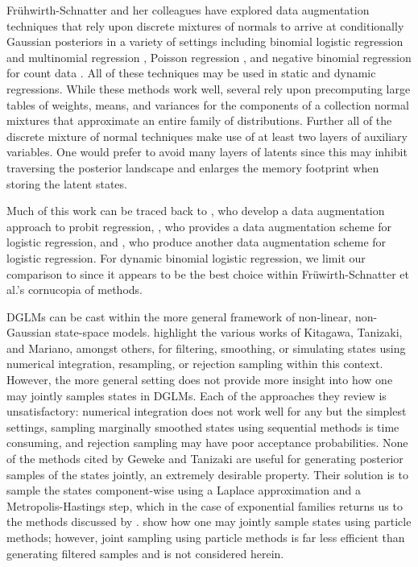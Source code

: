 \documentclass[12pt]{article}
\begin{document}
Fr\"{u}hwirth-Schnatter and her colleagues have explored data augmentation
techniques that rely upon discrete mixtures of normals to arrive at
conditionally Gaussian posteriors in a variety of settings including binomial
logistic regression and multinomial regression
\citep{fruhwirth-schnatter-fruhwirth-2007, fruhwirth-schnatter-fruhwirth-2010,
  fussl-etal-2013}, Poisson regression \citep{fruhwirth-schnatter-wagner-2006,
  fruhwirth-schnatter-etal-2009}, and negative binomial regression for count
data \citep{fruhwirth-schnatter-etal-2009}.  All of these techniques may be used
in static and dynamic regressions.  While these methods work well, several rely
upon precomputing large tables of weights, means, and variances for the
components of a collection normal mixtures that approximate an entire family of
distributions.  Further all of the discrete mixture of normal techniques make
use of at least two layers of auxiliary variables.  One would prefer to avoid
many layers of latents since this may inhibit traversing the posterior landscape
and enlarges the memory footprint when storing the latent states.

Much of this work can be traced back to \cite{albert-chib-1993}, who develop a
data augmentation approach to probit regression, \cite{mcfadden-1974}, who
provides a data augmentation scheme for logistic regression, and
\cite{holmes-held-2006}, who produce another data augmentation scheme for
logistic regression.  For dynamic binomial logistic regression, we limit our
comparison to \cite{fussl-etal-2013} since it appears to be the best choice
within Fr\"{u}wirth-Schnatter et al.'s cornucopia of methods.

DGLMs can be cast within the more general framework of non-linear, non-Gaussian
state-space models.  \cite{geweke-tanizaki-2001} highlight the various works of
Kitagawa, Tanizaki, and Mariano, amongst others, for filtering, smoothing, or
simulating states using numerical integration, resampling, or rejection sampling
within this context.  However, the more general setting does not provide more
insight into how one may jointly samples states in DGLMs.  Each of the
approaches they review is unsatisfactory: numerical integration does not work
well for any but the simplest settings, sampling marginally smoothed states
using sequential methods is time consuming, and rejection sampling may have poor
acceptance probabilities.  None of the methods cited by Geweke and Tanizaki are
useful for generating posterior samples of the states jointly, an extremely
desirable property.  Their solution is to sample the states component-wise using
a Laplace approximation and a Metropolis-Hastings step, which in the case of
exponential families returns us to the methods discussed by
\citep{gamerman-1998}.  \cite{godsill-etal-2004} show how one may jointly sample
states using particle methods; however, joint sampling using particle methods is
far less efficient than generating filtered samples and is not considered
herein.
\end{document}
